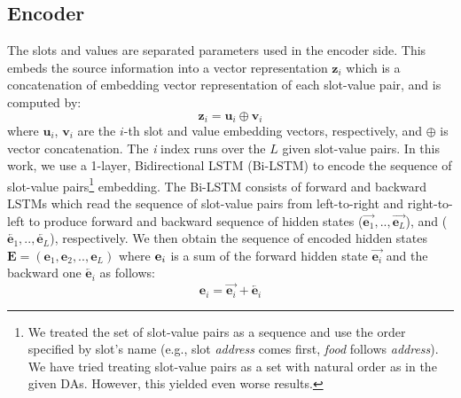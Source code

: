 \documentclass[11pt,a4paper]{article}
\begin{document}
\subsection{Encoder}
The slots and values are separated parameters used in the encoder side. This embeds the source information into a vector representation $\textbf{z}_{i}$ which is a concatenation of embedding vector representation of each slot-value pair, and is computed by:
\begin{equation}\label{eq:z-i-1}
\textbf{z}_{i} = \textbf{u}_{i} \oplus \textbf{v}_{i}
\end{equation}
where $\textbf{u}_{i}$, $\textbf{v}_{i}$ are the $i$-th slot and value embedding vectors, respectively, and $\oplus$ is vector concatenation. The \textit{i} index runs over the $L$ given slot-value pairs.
In this work, we use a 1-layer, Bidirectional LSTM (Bi-LSTM) to encode the sequence of slot-value pairs\footnote{We treated the set of slot-value pairs as a sequence and use the order specified by slot's name (e.g., slot \textit{address} comes first, \textit{food} follows \textit{address}). We have tried treating slot-value pairs as a set with natural order as in the given DAs. However, this yielded even worse results.} embedding. The Bi-LSTM consists of forward and backward LSTMs which read the sequence of slot-value pairs from left-to-right and right-to-left to produce forward and backward sequence of hidden states ($\overrightarrow{\textbf{e}_{1}}, .., \overrightarrow{\textbf{e}_{L}}$), and  ($\overleftarrow{\textbf{e}_{1}}, .., \overleftarrow{\textbf{e}_{L}}$), respectively. We then obtain the sequence of encoded hidden states $\textbf{E}=(\textbf{e}_{1}, \textbf{e}_{2}, .., \textbf{e}_{L})$ where $\textbf{\textbf{e}}_{i}$ is a sum of the forward hidden state $\overrightarrow{\textbf{e}_{i}}$ and the backward one $\overleftarrow{\textbf{e}_{i}}$ as follows:
\begin{equation}\label{eq:b-i}
\textbf{e}_{i}=\overrightarrow{\textbf{e}_{i}} + \overleftarrow{\textbf{e}_{i}}
\end{equation}
\end{document}
